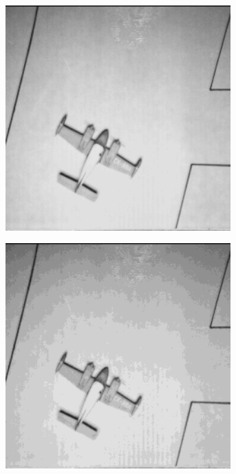 \begin{figure}
\begin{subfigure}[b]{.23\textwidth}
  \caption{}
  \label{fig:test-images-airplane}
\end{subfigure}
\begin{subfigure}[b]{.23\textwidth}
  \centering
  \includegraphics[width=0.95\textwidth]{figures/test-images/truncate2/airplane}
  \caption{}
  \label{fig:test-images-airplane}
\end{subfigure}
\begin{subfigure}[b]{.23\textwidth}
  \centering
  \includegraphics[width=0.95\textwidth]{figures/test-images/truncate4/airplane}
  \caption{}
  \label{fig:test-images-airplane}
\end{subfigure}


\end{figure}
